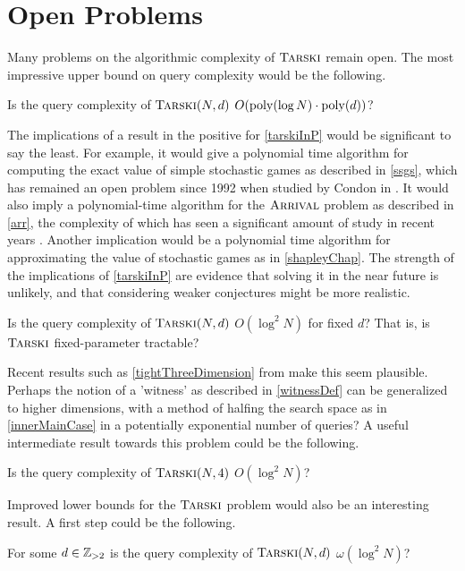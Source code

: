 \section{Open Problems}
Many problems on the algorithmic complexity of $\textsc{Tarski}$ remain 
open. The most impressive upper bound on query complexity would be the following.
\begin{open} \label{tarskiInP}
  Is the query complexity of $\textsc{Tarski}(N, d)$ $O(\mathrm{poly}(\log N) \cdot \mathrm{poly}(d))$?
\end{open}
The implications of a result in the positive for \cref{tarskiInP} would be significant to say the least.
For example, it would give a polynomial time algorithm for
computing the exact value of simple stochastic games as described in \cref{ssgs},
which has remained an open problem since 1992 when studied by Condon in \citep{condon}.
It would also imply a polynomial-time algorithm for the $\textsc{Arrival}$ problem as described in \cref{arr},
the complexity of which has seen a significant amount of study in recent years
\citep{gärtner2021subexponential, gärtner2018arrival, arrivalBasic, arrLowerBound}.
Another implication would be a polynomial time algorithm for approximating the value of
stochastic games as in \cref{shapleyChap}. The strength of the implications of \cref{tarskiInP}
are evidence that solving it in the near future is unlikely, and that considering weaker conjectures
might be more realistic.
\begin{open} \label{tarskiFixedParameterTractable}
  Is the query complexity of 
  $\textsc{Tarski}(N, d)$ $O(\log^2 N)$ for fixed $d$? That is, is $\textsc{Tarski}$ fixed-parameter tractable?
\end{open}
Recent results such as \cref{tightThreeDimension} from \citep{fasterTarski} make this seem
plausible. Perhaps the notion of a 'witness' as described in \cref{witnessDef} can be
generalized to higher dimensions, with a method of halfing the search space as in \cref{innerMainCase}
in a potentially exponential number of queries? A useful intermediate result towards this problem could be
the following.
\begin{open} \label{tightFourDimension}
  Is the query complexity of $\textsc{Tarski}(N, 4)$ $O(\log^2 N)$?
\end{open}
Improved lower bounds for the $\textsc{Tarski}$ problem would also be an interesting
result. A first step could be the following.
\begin{open}
  For some $d \in \mathbb{Z}_{> 2}$ is the query complexity of
  $\textsc{Tarski}(N, d)$ $\omega(\log^2 N)$?
\end{open}
